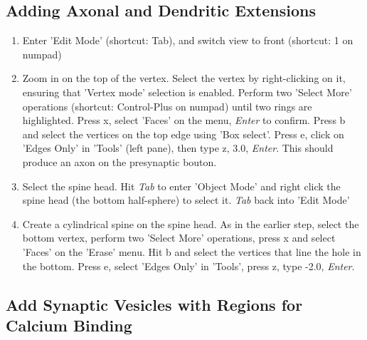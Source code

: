 \documentclass[twoside,a4paper]{refart}
\begin{document}
\subsection{Adding Axonal and Dendritic Extensions}

\begin{enumerate}

\item   Enter 'Edit Mode' (shortcut: Tab), and switch view to front (shortcut: 1 on numpad)

\item   Zoom in on the top of the vertex. Select the vertex by right-clicking on it, ensuring that 'Vertex mode' selection is enabled. Perform two 'Select More' operations (shortcut: Control-Plus on numpad) until two rings are highlighted. Press x, select 'Faces' on the menu, \textit{Enter} to confirm. Press b and select the vertices on the top edge using 'Box select'. Press e, click on 'Edges Only' in 'Tools' (left pane), then type z, 3.0, \textit{Enter}. This should produce an axon on the presynaptic bouton.

\item   Select the spine head. Hit \textit{Tab} to enter 'Object Mode' and right click the spine head (the bottom half-sphere) to select it. \textit{Tab} back into 'Edit Mode'

\item   Create a cylindrical spine on the spine head. As in the earlier step, select the bottom vertex, perform two 'Select More' operations, press x and select 'Faces' on the 'Erase' menu. Hit b and select the vertices that line the hole in the bottom. Press e, select 'Edges Only' in 'Tools', press z, type -2.0, \textit{Enter}. 

\end{enumerate}

\subsection{Add Synaptic Vesicles with Regions for Calcium Binding}
\end{document}
